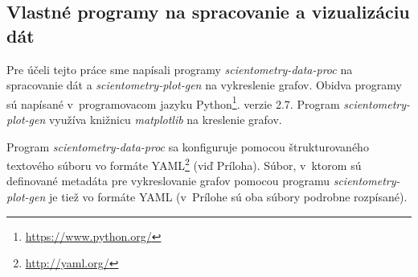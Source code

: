 \subsection{Vlastné programy na spracovanie a vizualizáciu dát}
\label{sec:program.my}

Pre účeli tejto práce sme napísali programy \emph{scientometry-data-proc} na
spracovanie dát a \emph{scientometry-plot-gen} na vykreslenie grafov.  Obidva
programy sú napísané v~programovacom jazyku
Python\footnote{\url{https://www.python.org/}}. verzie 2.7. 
Program \emph{scientometry-plot-gen} využíva knižnicu \emph{matplotlib} na kreslenie
grafov.

Program \emph{scientometry-data-proc} sa konfiguruje pomocou štrukturovaného
textového súboru vo formáte YAML\footnote{\url{http://yaml.org/}} (viď
Príloha). Súbor, v~ktorom sú definované metadáta pre vykreslovanie grafov
pomocou programu \emph{scientometry-plot-gen} je tiež vo formáte YAML
(v~Prílohe sú oba súbory podrobne rozpísané).  


